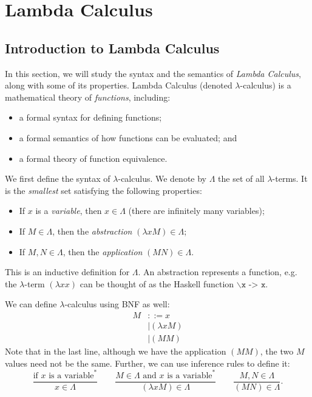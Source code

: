 \documentclass[a4paper, openany]{memoir}
\theoremstyle{definition}
\begin{document}
    \chapter{Lambda Calculus}
    \section{Introduction to Lambda Calculus}
    In this section, we will study the syntax and the semantics of \emph{Lambda Calculus}, along with some of its properties. Lambda Calculus (denoted $\lambda$-calculus) is a mathematical theory of \emph{functions}, including:
    \begin{itemize}
        \item a formal syntax for defining functions;
        \item a formal semantics of how functions can be evaluated; and
        \item a formal theory of function equivalence.
    \end{itemize}

    We first define the syntax of $\lambda$-calculus. We denote by $\Lambda$ the set of all $\lambda$-terms. It is the \emph{smallest} set satisfying the following properties:
    \begin{itemize}
        \item If $x$ is a \emph{variable}, then $x \in \Lambda$ (there are infinitely many variables);
        \item If $M \in \Lambda$, then the \emph{abstraction} $(\lambda x M) \in \Lambda$;
        \item If $M, N \in \Lambda$, then the \emph{application} $(MN) \in \Lambda$.
    \end{itemize}
    This is an inductive definition for $\Lambda$. An abstraction represents a function, e.g. the $\lambda$-term $(\lambda x x)$ can be thought of as the Haskell function $\backslash \texttt{x -> x}$. 
    
    We can define $\lambda$-calculus using BNF as well:
    \begin{align*}
        M &::= x \\
        &\mid (\lambda x M) \\
        &\mid (MM)
    \end{align*}
    Note that in the last line, although we have the application $(MM)$, the two $M$ values need not be the same. Further, we can use inference rules to define it:
    \[\frac{\textrm{if } x \textrm{ is a variable}^*}{x \in \Lambda} \qquad \frac{M \in \Lambda \textrm{ and } x \textrm{ is a variable}^*}{(\lambda x M) \in \Lambda} \qquad \frac{M, N \in \Lambda}{(MN) \in \Lambda}.\]
\end{document}
